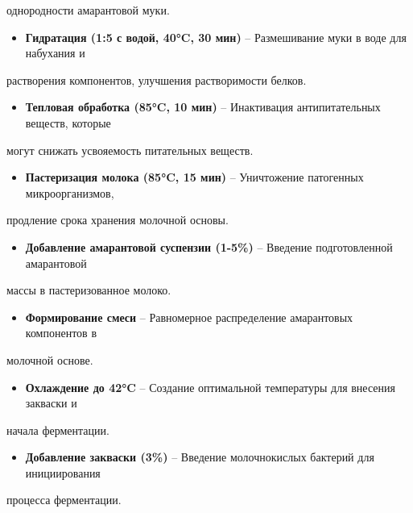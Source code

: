 {однородности амарантовой муки.

\begin{itemize}
\item
  {\bfseries Гидратация (1:5 с водой, 40°C, 30 мин)} -- Размешивание муки в
  воде для набухания и
\end{itemize}

растворения компонентов, улучшения растворимости белков.

\begin{itemize}
\item
  {\bfseries Тепловая обработка (85°C, 10 мин)} -- Инактивация
  антипитательных веществ, которые
\end{itemize}

могут снижать усвояемость питательных веществ.

\begin{itemize}
\item
  {\bfseries Пастеризация молока (85°C, 15 мин)} -- Уничтожение патогенных
  микроорганизмов,
\end{itemize}

продление срока хранения молочной основы.

\begin{itemize}
\item
  {\bfseries Добавление амарантовой суспензии (1-5\%)} -- Введение
  подготовленной амарантовой
\end{itemize}

массы в пастеризованное молоко.

\begin{itemize}
\item
  {\bfseries Формирование смеси} -- Равномерное распределение амарантовых
  компонентов в
\end{itemize}

молочной основе.

\begin{itemize}
\item
  {\bfseries Охлаждение до 42°C} -- Создание оптимальной температуры для
  внесения закваски и
\end{itemize}

начала ферментации.

\begin{itemize}
\item
  {\bfseries Добавление закваски (3\%)} -- Введение молочнокислых бактерий
  для инициирования
\end{itemize}

процесса ферментации.

}
